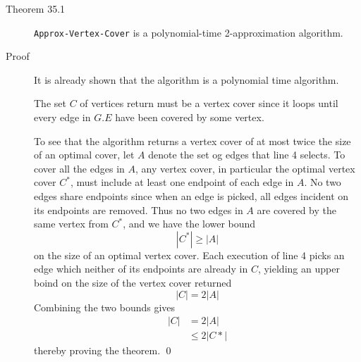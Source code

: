 \begin{description}
\item[Theorem 35.1] \texttt{Approx-Vertex-Cover} is a polynomial-time
  2-approximation algorithm.
\item[Proof] It is already shown that the algorithm is a polynomial time
  algorithm.

  The set $C$ of vertices return must be a vertex cover since it loops until
  every edge in $G.E$ have been covered by some vertex.

  To see that the algorithm returns a vertex cover of at most twice the size of
  an optimal cover, let $A$ denote the set og edges that line 4 selects.  To
  cover all the edges in $A$, any vertex cover, in particular the optimal vertex
  cover $C^*$, must include at least one endpoint of each edge in $A$. No two
  edges share endpoints since when an edge is picked, all edges incident on its
  endpoints are removed. Thus no two edges in $A$ are covered by the same vertex
  from $C^*$, and we have the lower bound
  \[
    |C^*| \geq |A|
  \]
  on the size of an optimal vertex cover. Each execution of line 4 picks an edge
  which neither of its endpoints are already in $C$, yielding an upper boind on
  the size of the vertex cover returned
  \[
    |C| = 2|A|
  \]
  Combining the two bounds gives
  \begin{align*}
    |C| &= 2|A| \\
        &\leq 2|C*|
  \end{align*}
  thereby proving the theorem. \qed
\end{description}